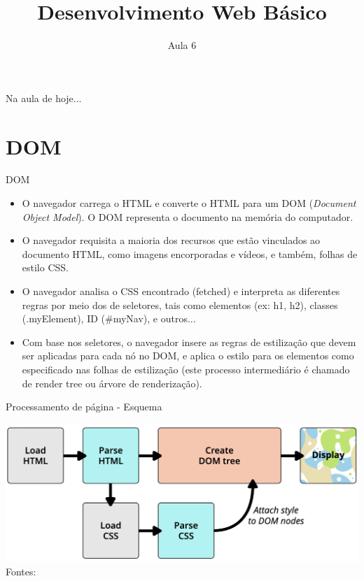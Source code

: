 \documentclass{beamer}
\date{}
\title{Desenvolvimento Web Básico}
\subtitle{Aula 6}
\begin{document}
\frame{
 \titlepage
}

\begin{frame}{Na aula de hoje...} 
\tableofcontents 
\end{frame}
\section{DOM}
\begin{frame}{DOM}
\begin{itemize}
    \item O navegador carrega o HTML e converte o HTML para um DOM (\textit{Document Object Model}). O DOM representa o documento na memória do computador.
    \item O navegador requisita a maioria dos recursos que estão vinculados ao documento HTML, como imagens encorporadas e vídeos, e também, folhas de estilo CSS.
    \item O navegador analisa o CSS encontrado (fetched) e interpreta as diferentes regras por meio dos de seletores, tais como elementos (ex: h1, h2), classes (.myElement), ID (\#myNav), e outros...
    \item Com base nos seletores, o navegador insere as regras de estilização que devem ser aplicadas para cada nó no DOM, e aplica o estilo para os elementos como especificado nas folhas de estilização (este processo intermediário é chamado de render tree ou árvore de renderização).
\end{itemize}
\end{frame}
\begin{frame}{Processamento de página - Esquema}
\begin{center}
		  \includegraphics[height=0.45\paperheight]{fig/aula2/dom.png} \\
		   \tiny Fontes: \cite{mdn2023}
	  \end{center}
    
\end{frame}
\end{document}
